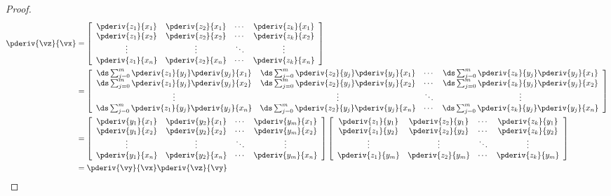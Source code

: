 \begin{proof}
\begin{align*}
  \pderiv{\vz}{\vx}
    &= \left[\begin{array}{ccccc}
         \pderiv{z_1}{x_1} & \pderiv{z_2}{x_1} & \cdots & \pderiv{z_k}{x_1} \\
         \pderiv{z_1}{x_2} & \pderiv{z_2}{x_2} & \cdots & \pderiv{z_k}{x_2} \\
         \vdots            & \vdots            & \ddots & \vdots            \\
         \pderiv{z_1}{x_n} & \pderiv{z_2}{x_n} & \cdots & \pderiv{z_k}{x_n}
       \end{array}\right]
  \\&= \left[\begin{array}{ccccc}
         \ds\sum_{j=0}^m \pderiv{z_1}{y_j}\pderiv{y_j}{x_1} 
       & \ds\sum_{j=0}^m \pderiv{z_2}{y_j}\pderiv{y_j}{x_1} 
       & \cdots 
       & \ds\sum_{j=0}^m \pderiv{z_k}{y_j}\pderiv{y_j}{x_1}  
       \\
         \ds\sum_{j=0}^m \pderiv{z_1}{y_j}\pderiv{y_j}{x_2} 
       & \ds\sum_{j=0}^m \pderiv{z_2}{y_j}\pderiv{y_j}{x_2} 
       & \cdots 
       & \ds\sum_{j=0}^m \pderiv{z_k}{y_j}\pderiv{y_j}{x_2}  
       \\
         \vdots            & \vdots            & \ddots & \vdots            
       \\
         \ds\sum_{j=0}^m \pderiv{z_1}{y_j}\pderiv{y_j}{x_n} 
       & \ds\sum_{j=0}^m \pderiv{z_2}{y_j}\pderiv{y_j}{x_n} 
       & \cdots 
       & \ds\sum_{j=0}^m \pderiv{z_k}{y_j}\pderiv{y_j}{x_n}  
       \end{array}\right]
  \\&= \left[\begin{array}{ccccc}
          \pderiv{y_1}{x_1} &  \pderiv{y_2}{x_1} & \cdots &  \pderiv{y_m}{x_1}  \\
          \pderiv{y_1}{x_2} &  \pderiv{y_2}{x_2} & \cdots &  \pderiv{y_m}{x_2}  \\
          \vdots            &  \vdots            & \ddots & \vdots              \\
          \pderiv{y_1}{x_n} &  \pderiv{y_2}{x_n} & \cdots &  \pderiv{y_m}{x_n}  
       \end{array}\right]
       \left[\begin{array}{ccccc}
          \pderiv{z_1}{y_1} & \pderiv{z_2}{y_1}  & \cdots &  \pderiv{z_k}{y_1}  \\                 
          \pderiv{z_1}{y_2} & \pderiv{z_2}{y_2}  & \cdots &  \pderiv{z_k}{y_2}  \\
          \vdots            & \vdots             & \ddots & \vdots              \\
          \pderiv{z_1}{y_m} & \pderiv{z_2}{y_m}  & \cdots &  \pderiv{z_k}{y_m}
       \end{array}\right]
  \\&= \pderiv{\vy}{\vx} \pderiv{\vz}{\vy}
\end{align*}
\end{proof}


